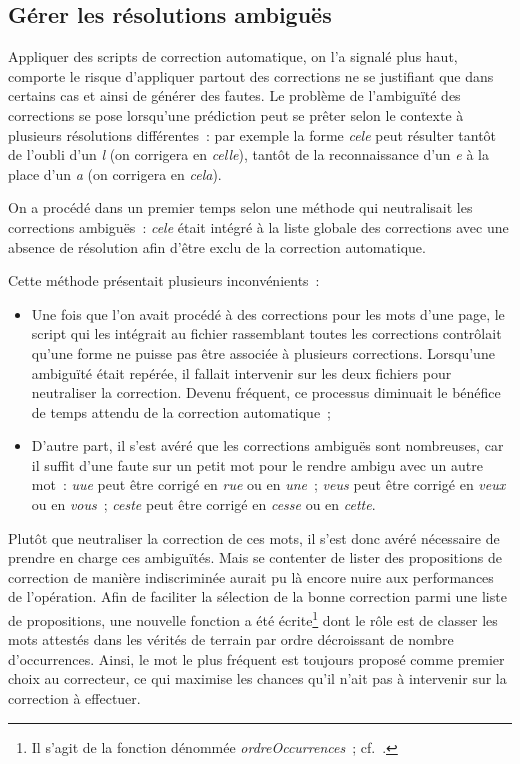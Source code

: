 \documentclass[a4paper,12pt,twoside]{book}
\begin{document}
			\subsection{Gérer les résolutions ambiguës}
				Appliquer des scripts de correction automatique, on l'a signalé plus haut, comporte le risque d'appliquer partout des corrections ne se justifiant que dans certains cas et ainsi de générer des fautes. Le problème de l'ambiguïté des corrections se pose lorsqu'une \gls{prédiction} peut se prêter selon le contexte à plusieurs résolutions différentes~: par exemple la forme \textit{cele} peut résulter tantôt de l'oubli d'un \textit{l} (on corrigera en \textit{celle}), tantôt de la reconnaissance d'un \textit{e} à la place d'un \textit{a} (on corrigera en \textit{cela}).
							
				On a procédé dans un premier temps selon une méthode qui neutralisait les corrections ambiguës~: \textit{cele} était intégré à la liste globale des corrections avec une absence de résolution afin d'être exclu de la correction automatique.
				
				Cette méthode présentait plusieurs inconvénients~:

				\begin{itemize}
					\item Une fois que l'on avait procédé à des corrections pour les mots d'une page, le script qui les intégrait au fichier rassemblant toutes les corrections contrôlait qu'une forme ne puisse pas être associée à plusieurs corrections. Lorsqu'une ambiguïté était repérée, il fallait intervenir sur les deux fichiers pour neutraliser la correction. Devenu fréquent, ce processus diminuait le bénéfice de temps attendu de la correction automatique~;

					\item D'autre part, il s'est avéré que les corrections ambiguës sont nombreuses, car il suffit d'une faute sur un petit mot pour le rendre ambigu avec un autre mot~: \textit{uue} peut être corrigé en \textit{rue} ou en \textit{une}~; \textit{veus} peut être corrigé en \textit{veux} ou en \textit{vous}~; \textit{ceste} peut être corrigé en \textit{cesse} ou en \textit{cette}.
				\end{itemize}
				
				Plutôt que neutraliser la correction de ces mots, il s'est donc avéré nécessaire de prendre en charge ces ambiguïtés. Mais se contenter de lister des propositions de correction de manière indiscriminée aurait pu là encore nuire aux performances de l'opération. Afin de faciliter la sélection de la bonne correction parmi une liste de propositions, une nouvelle fonction a été écrite\footnote{Il s'agit de la fonction dénommée \textit{ordreOccurrences}~; cf.~\cite{biaySpellcheckTextsPy2022}.} dont le rôle est de classer les mots attestés dans les vérités de terrain par ordre décroissant de nombre d'occurrences. Ainsi, le mot le plus fréquent est toujours proposé comme premier choix au correcteur, ce qui maximise les chances qu'il n'ait pas à intervenir sur la correction à effectuer.
			
\end{document}
